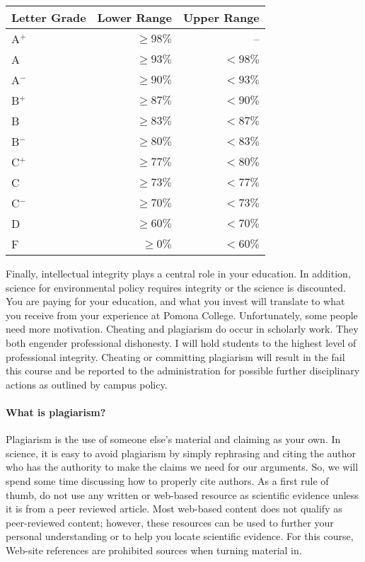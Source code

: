\begin{table}[htbp]
	\centering
\begin{tabular}{lrr} \hline
Letter Grade & Lower Range & Upper Range \\ \hline\hline
A$^+$  &$ \geq98\%$ & --		 \\
A      & $\geq93\%$ & $<98\%$\\
A$^-$  & $\geq90\%$ & $<93\%$\\
B$^+$  & $\geq87\%$ & $<90\%$\\
B      & $\geq83\%$ & $<87\%$\\
B$^-$  & $\geq80\%$ & $<83\%$\\
C$^+$  & $\geq77\%$ & $<80\%$\\
C      & $\geq73\%$ & $<77\%$\\
C$^-$  & $\geq70\%$ & $<73\%$\\
D      & $\geq60\%$ & $<70\%$\\
F      & $\geq0\% $ & $<60\%$\\ \hline
		\end{tabular}
\end{table}

Finally, intellectual integrity plays a central role in your education. In addition, science for environmental policy requires integrity or the science is discounted. You are paying for your education, and what you invest will translate to what you receive from your experience at Pomona College. Unfortunately, some people need more motivation. Cheating and plagiarism do occur in scholarly work. They both engender professional dishonesty. I will hold students to the highest level of professional integrity. Cheating or committing plagiarism will result in the fail this course and be reported to the administration for possible further disciplinary actions as outlined by campus policy.


\paragraph{What is plagiarism?} Plagiarism is the use of someone else's material and claiming as your own. In science, it is easy to avoid plagiarism by simply rephrasing and citing the author who has the authority to make the claims we need for our arguments. So, we will spend some time discussing how to properly cite authors. As a first rule of thumb, do not use any written or web-based resource as scientific evidence unless it is from a peer reviewed article. Most web-based content does not qualify as peer-reviewed content; however, these resources can be used to further your personal understanding or to help you locate scientific evidence. For this course, Web-site references are prohibited sources when turning material in.

